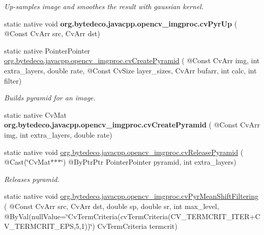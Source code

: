 \begin{DoxyCompactItemize}
\begin{DoxyCompactList}\small\item\em Up-\/samples image and smoothes the result with gaussian kernel. \end{DoxyCompactList}\item 
\mbox{\label{group__imgproc__c_ga3121f9b420355a5fe0c4583d77e2f68d}} 
static native void {\bfseries org.\+bytedeco.\+javacpp.\+opencv\+\_\+imgproc.\+cv\+Pyr\+Up} ( @Const Cv\+Arr src, Cv\+Arr dst)
\item 
static native Pointer\+Pointer \hyperlink{group__imgproc__c_gad819c70ae44efaea82dfbf9745633179}{org.\+bytedeco.\+javacpp.\+opencv\+\_\+imgproc.\+cv\+Create\+Pyramid} ( @Const Cv\+Arr img, int extra\+\_\+layers, double rate, @Const Cv\+Size layer\+\_\+sizes, Cv\+Arr bufarr, int calc, int filter)
\begin{DoxyCompactList}\small\item\em Builds pyramid for an image. \end{DoxyCompactList}\item 
\mbox{\label{group__imgproc__c_gaa7de42cd41da20f87f5a3cf4fc0fc10a}} 
static native Cv\+Mat {\bfseries org.\+bytedeco.\+javacpp.\+opencv\+\_\+imgproc.\+cv\+Create\+Pyramid} ( @Const Cv\+Arr img, int extra\+\_\+layers, double rate)
\item 
\mbox{\label{group__imgproc__c_gafedcfec1793dc4d6dd6e5c97d4fb30a0}} 
static native void \hyperlink{group__imgproc__c_gafedcfec1793dc4d6dd6e5c97d4fb30a0}{org.\+bytedeco.\+javacpp.\+opencv\+\_\+imgproc.\+cv\+Release\+Pyramid} ( @Cast(\char`\"{}Cv\+Mat$\ast$$\ast$$\ast$\char`\"{}) @By\+Ptr\+Ptr Pointer\+Pointer pyramid, int extra\+\_\+layers)
\begin{DoxyCompactList}\small\item\em Releases pyramid. \end{DoxyCompactList}\item 
static native void \hyperlink{group__imgproc__c_ga03ca86df80599c20db2980fb4a3eeed2}{org.\+bytedeco.\+javacpp.\+opencv\+\_\+imgproc.\+cv\+Pyr\+Mean\+Shift\+Filtering} ( @Const Cv\+Arr src, Cv\+Arr dst, double sp, double sr, int max\+\_\+level, @By\+Val(null\+Value=\char`\"{}Cv\+Term\+Criteria(cv\+Term\+Criteria(C\+V\+\_\+\+T\+E\+R\+M\+C\+R\+I\+T\+\_\+\+I\+T\+ER+C\+V\+\_\+\+T\+E\+R\+M\+C\+R\+I\+T\+\_\+\+E\+PS,5,1))\char`\"{}) Cv\+Term\+Criteria termcrit)

\end{DoxyCompactItemize}
